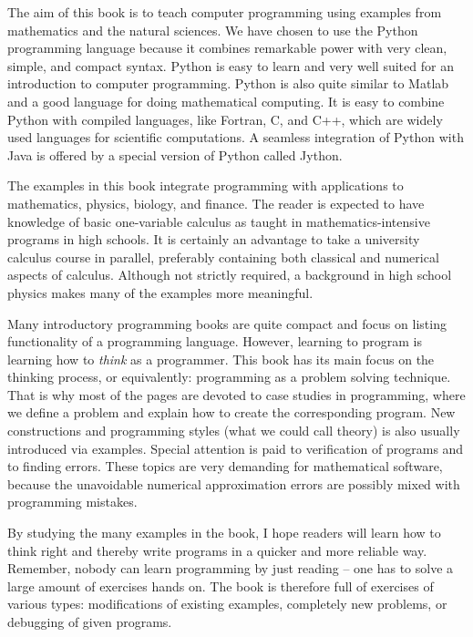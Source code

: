 
The aim of this book is to teach computer programming using
examples from mathematics and the natural sciences.
We have chosen to use the Python programming language because it
combines remarkable power with very clean, simple, and compact syntax.
Python is easy to learn and very well suited for an introduction to
computer programming. Python is also quite similar to Matlab and
a good language for doing mathematical computing.
It is easy to combine Python with compiled languages, like Fortran, C, and
C++, which are widely used languages for scientific computations.
A seamless integration of Python with Java is offered by a special
version of Python called Jython.


The examples in this book integrate programming with applications to
mathematics, physics, biology, and finance.  The reader is expected to
have knowledge of basic one-variable calculus as taught in
mathematics-intensive programs in high schools. It is certainly an
advantage to take a university calculus course in parallel, preferably
containing both classical and numerical aspects of calculus.  Although
not strictly required, a background in high school physics makes many
of the examples more meaningful.

Many introductory programming books are quite compact and focus on
listing functionality of a programming language. However, learning to
program is learning how to \emph{think} as a programmer.  This book
has its main focus on the thinking process, or equivalently:
programming as a problem solving technique. That is why most of the
pages are devoted to case studies in programming, where we define a
problem and explain how to create the corresponding program.  New
constructions and programming styles (what we could call theory) is also usually
introduced via examples.  Special attention is paid to verification of
programs and to finding errors. These topics are very demanding for
mathematical software, because the unavoidable numerical
approximation errors are possibly mixed with programming mistakes.

By studying the many examples in the
book, I hope readers will learn how to think right and thereby
write programs in a quicker and more reliable way. Remember, nobody can learn
programming by just reading -- one has to solve a large amount of
exercises hands on.  The book is therefore full of exercises of
various types: modifications of existing examples, completely new
problems, or debugging of given programs.

